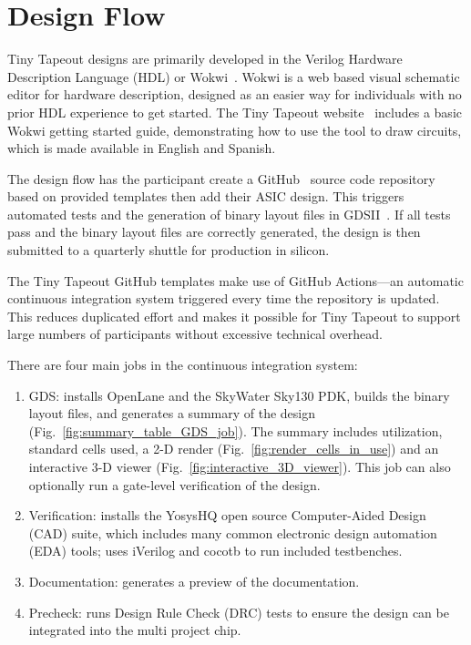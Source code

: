 \section{Design Flow}
\label{sec:design_flow}

Tiny Tapeout designs are primarily developed in the Verilog Hardware Description Language (HDL) or Wokwi~\cite{wokwi}.
Wokwi is a web based visual schematic editor for hardware description, designed as an easier way for individuals with no prior HDL experience to get started.
The Tiny Tapeout website~\cite{tinytapeout} includes a basic Wokwi getting started guide, demonstrating how to use the tool to draw circuits, which is made available in English and Spanish.

The design flow has the participant create a GitHub~\cite{github} source code repository based on provided templates then add their ASIC design. This triggers automated tests and the generation of binary layout files in GDSII~\cite{gds}. If all tests pass and the binary layout files are correctly generated, the design is then submitted to a quarterly shuttle for production in silicon.

The Tiny Tapeout GitHub templates\cite{verilogtemplate} make use of GitHub Actions\cite{githubactions}---an automatic continuous integration system triggered every time the repository is updated. This reduces duplicated effort and makes it possible for Tiny Tapeout to support large numbers of participants without excessive technical overhead.

There are four main jobs in the continuous integration system:

\begin{enumerate}
	\item GDS: installs OpenLane\cite{openlane} and the SkyWater Sky130\cite{skywaterpdk} PDK, builds the binary layout files, and generates a summary of the design (Fig.~\ref{fig:summary_table_GDS_job}). The summary includes utilization, standard cells used, a 2-D render (Fig.~\ref{fig:render_cells_in_use}) and an interactive 3-D viewer (Fig.~\ref{fig:interactive_3D_viewer}).
This job can also optionally run a gate-level verification of the design.
	\item Verification: installs the YosysHQ open source Computer-Aided Design (CAD) suite, which includes many common electronic design automation (EDA) tools; uses iVerilog\cite{iverilog} and cocotb\cite{cocotb} to run included testbenches.
	\item Documentation: generates a preview of the documentation.
	\item Precheck: runs Design Rule Check (DRC) tests to ensure the design can be integrated into the multi project chip.
\end{enumerate}

